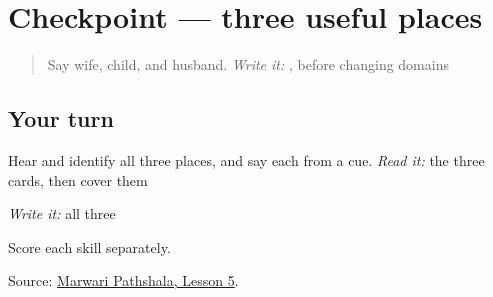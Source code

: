 \section[Practice]{Checkpoint — three useful places}

\label{lesson:MW-R10-places-three}



\begin{quote}
Say wife, child, and husband. \emph{Write it:} \textbf{}, before changing domains
\end{quote}

\subsection*{Your turn}
Hear and identify all three places, and say each from a cue. \emph{Read it:} the three cards, then cover them

\emph{Write it:} all three

Score each skill separately.

\begin{tcolorbox}[breakable,colback=teal!4,colframe=teal!35!black,title={Before you move on}]
Source: \href{https://www.marwaripathshala.com/marwari-lesson-5-english}{Marwari Pathshala, Lesson 5}.
\end{tcolorbox}
